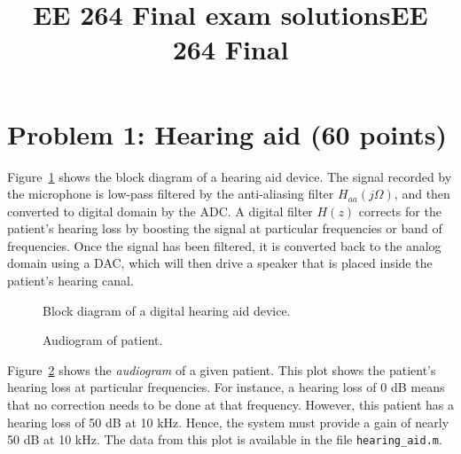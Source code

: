 \documentclass[10pt]{article}
\title{EE 264 Final exam solutions}
\title{EE 264 Final}
\begin{document}

\pagebreak


\section*{Problem 1: Hearing aid (60 points)}

Figure~\ref{fig:hearing_aid_diagram} shows the block diagram of a hearing aid device. The signal recorded by the microphone is low-pass filtered by the anti-aliasing filter $H_{aa}(j\Omega)$, and then converted to digital domain by the ADC. A digital filter $H(z)$ corrects for the patient's hearing loss by boosting the signal at particular frequencies or band of frequencies. Once the signal has been filtered, it is converted back to the analog domain using a DAC, which will then drive a speaker that is placed inside the patient's hearing canal. 

\FloatBarrier
\begin{figure}[h!]
	\centering
	\resizebox{\textwidth}{!}{}
	\caption{Block diagram of a digital hearing aid device.}
	\label{fig:hearing_aid_diagram}
\end{figure}
\FloatBarrier

\FloatBarrier
\begin{figure}[h!]
	\centering
	\resizebox{0.7\textwidth}{!}{}
	\caption{Audiogram of patient.}
	\label{fig:audiogram}
\end{figure}
\FloatBarrier

Figure~\ref{fig:audiogram} shows the \textit{audiogram} of a given patient. This plot shows the patient's hearing loss at particular frequencies. For instance, a hearing loss of 0 dB means that no correction needs to be done at that frequency. However, this patient has a hearing loss of 50 dB at 10 kHz. Hence, the system must provide a gain of nearly 50 dB at 10 kHz. The data from this plot is available in the file \texttt{hearing\_aid.m}. 
\end{document}
